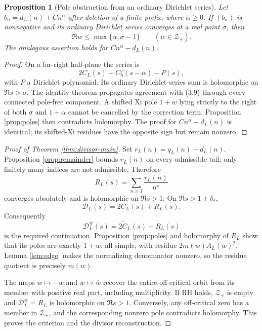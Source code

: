 \documentclass[11pt]{article}
\newtheorem{proposition}[theorem]{Proposition}
\newcommand{\cZ}{\mathcal Z}
\begin{document}
\begin{proposition}[Pole obstruction from an ordinary Dirichlet series]\label{prop:pole-obstruction}
Let \(b_n=d_L(n)+Cn^\alpha\) after deletion of a finite prefix, where \(\alpha\ge0\).
If \((b_n)\) is nonnegative and its ordinary Dirichlet series converges at a real point
\(\sigma\), then
\[
 \Re w\le\max\{\alpha,\sigma-1\}
\qquad(w\in\cZ_+).
\tag{3.8}
\]
The analogous assertion holds for \(Cn^\alpha-d_L(n)\).
\end{proposition}

\begin{proof}
On a far-right half-plane the series is
\[
 2C_L(s)+C\zeta(s-\alpha)-P(s),
\tag{3.9}
\]
with \(P\) a Dirichlet polynomial.  Its ordinary Dirichlet-series sum is holomorphic on
\(\Re s>\sigma\).  The identity theorem propagates agreement with (3.9) through every connected
pole-free component.  A shifted Xi pole \(1+w\) lying strictly to the right of both
\(\sigma\) and \(1+\alpha\) cannot be cancelled by the correction term.  Proposition
\ref{prop:poles} then contradicts holomorphy.  The proof for \(Cn^\alpha-d_L(n)\) is identical;
its shifted-Xi residues have the opposite sign but remain nonzero.
\end{proof}

\begin{proof}[Proof of Theorem \ref{thm:divisor-main}]
Set \(r_L(n)=q_L(n)-d_L(n)\).  Proposition \ref{prop:remainder} bounds \(r_L(n)\) on every
admissible tail; only finitely many indices are not admissible.  Therefore
\[
 R_L(s)=\sum_{n\ge1}\frac{r_L(n)}{n^s}
\]
converges absolutely and is holomorphic on \(\Re s>1\).  On
\(\Re s>1+\delta_*\),
\[
 \mathcal D_L(s)=2C_L(s)+R_L(s).
\]
Consequently
\[
 \mathcal D_L^\#(s)=2\widetilde C_L(s)+R_L(s)
\]
is the required continuation.  Proposition \ref{prop:poles} and holomorphy of \(R_L\) show that
its poles are exactly \(1+w\), all simple, with residue
\(2m(w)A_L(w)^2\).  Lemma \ref{lem:edge} makes the normalizing denominator nonzero, so the
residue quotient is precisely \(m(w)\).

The maps \(w\mapsto-w\) and \(w\mapsto\overline w\) recover the entire off-critical orbit from
its member with positive real part, including multiplicity.  If RH holds, \(\cZ_+\) is empty and
\(\mathcal D_L^\#=R_L\) is holomorphic on \(\Re s>1\).  Conversely, any off-critical zero has a
member in \(\cZ_+\), and the corresponding nonzero pole contradicts holomorphy.  This proves the
criterion and the divisor reconstruction.
\end{proof}
\end{document}

